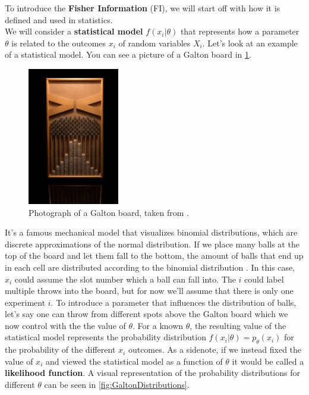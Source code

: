 To introduce the \textbf{Fisher Information} (FI), we will start off with how it is defined and used in statistics.\\
We will consider a \textbf{statistical model} $f(x_i|\theta)$ that represents how a parameter $\theta$ is related to the outcomes $x_i$ of random variables $X_i$\cite{StatisticFisherInfoTutorial}. Let's look at an example of a statistical model. You can see a picture of a Galton board in \cref{fig:GaltonPicture}.
\begin{figure}
	\centering
	\includegraphics[width = 4cm]{text/FisherInformation/plots/GaltonBoard.jpg}
	\caption{Photograph of a Galton board, taken from \cite{GaltonBoardPicture}.}
	\label{fig:GaltonPicture}
\end{figure}
It's a famous mechanical model that visualizes binomial distributions, which are discrete approximations of the normal distribution. If we place many balls at the top of the board and let them fall to the bottom, the amount of balls that end up in each cell are distributed according to the binomial distribution \cite{GaltonBoardArticle}. In this case, $x_i$ could assume the slot number which a ball can fall into. The $i$ could label multiple throws into the board, but for now we'll assume that there is only one experiment $i$. To introduce a parameter that influences the distribution of balls, let's say one can throw from different spots above the Galton board which we now control with the the value of $\theta$. For a known $\theta$, the resulting value of the statistical model represents the probability distribution $f(x_i|\theta) = p_\theta(x_i)$ for the probability of the different $x_i$ outcomes. As a sidenote, if we instead fixed the value of $x_i$ and viewed the statistical model as a function of $\theta$ it would be called a \textbf{likelihood function}. A visual representation of the probability distributions for different $\theta$ can be seen in \cref{fig:GaltonDistributions}.
